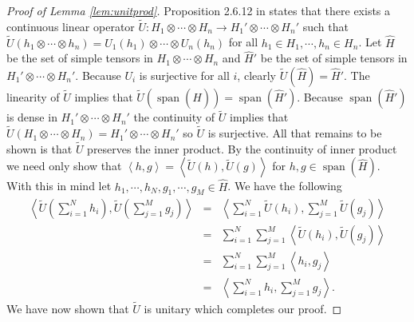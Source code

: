 \documentclass{article} %
\def\l{\left}
\def\r{\right}
\def\span{\operatorname{span}}
\theoremstyle{definition}
\begin{document}
\begin{proof}[Proof of Lemma \ref{lem:unitprod}]
	Proposition 2.6.12 in \cite{kadison83} states that there exists a continuous linear operator $\tilde{U}:H_1 \otimes \cdots \otimes H_n \to H_1' \otimes \cdots \otimes H_n'$ such that $\tilde{U}\left( h_1 \otimes\cdots \otimes h_n \right) = U_1(h_1) \otimes \cdots \otimes U_n(h_n)$ for all $h_1 \in H_1 ,\cdots, h_n \in H_n$. Let $\widehat{H}$ be the set of simple tensors in $H_1 \otimes \cdots \otimes H_n$ and $\widehat{H}'$ be the set of simple tensors in $H_1'\otimes \cdots \otimes H_n'$. Because $U_i$ is surjective for all $i$, clearly $\tilde{U}(\widehat{H}) = \widehat{H}'$. The linearity of $\tilde{U}$ implies that $\tilde{U}(\span(\widehat{H}))= \span(\widehat{H}')$. Because $\span(\widehat{H}')$ is dense in $H_1'\otimes \cdots \otimes H_n'$ the continuity of $\tilde{U}$ implies that $\tilde{U}(H_1\otimes\cdots \otimes H_n) = H_1'\otimes \cdots \otimes H_n'$ so $\tilde{U}$ is surjective. All that remains to be shown is that $\tilde{U}$ preserves the inner product. By the continuity of inner product we need only show that $\l<h, g\r>=\l<\tilde{U}(h), \tilde{U}(g)\r>$ for $h,g \in \span(\widehat{H})$. With this in mind let $h_1,\cdots, h_N,g_1,\cdots,g_M \in \widehat{H}$. We have the following
\begin{eqnarray*}
	\l<\tilde{U}\l(\sum_{i=1}^N h_i\r),\tilde{U}\l(\sum_{j=1}^M g_j\r) \r>
	&=& \l<\sum_{i=1}^N \tilde{U}\l(h_i\r),\sum_{j=1}^M \tilde{U}\l(g_j\r) \r>\\
	&=& \sum_{i=1}^N\sum_{j=1}^M\l< \tilde{U}\l(h_i\r), \tilde{U}\l(g_j\r) \r>\\
	&=& \sum_{i=1}^N\sum_{j=1}^M\l< h_i, g_j \r>\\
	&=& \l< \sum_{i=1}^Nh_i, \sum_{j=1}^M g_j \r>.
\end{eqnarray*}
We have now shown that $\tilde{U}$ is unitary which completes our proof.
\end{proof}
\end{document}
